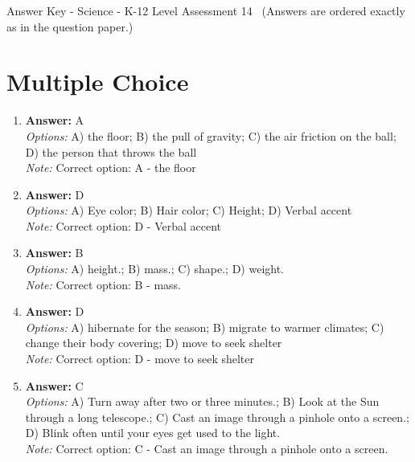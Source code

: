 \documentclass[12pt]{article}
\begin{document}
\begin{center}
Answer Key - Science - K-12 Level Assessment 14 \
\small (Answers are ordered exactly as in the question paper.)
\end{center}

\section*{Multiple Choice}
\begin{enumerate}[label=\arabic*.]
\item \textbf{Answer:} A
\\ \textit{Options:} A) the floor; B) the pull of gravity; C) the air friction on the ball; D) the person that throws the ball
\\ \textit{Note:} Correct option: A - the floor
\item \textbf{Answer:} D
\\ \textit{Options:} A) Eye color; B) Hair color; C) Height; D) Verbal accent
\\ \textit{Note:} Correct option: D - Verbal accent
\item \textbf{Answer:} B
\\ \textit{Options:} A) height.; B) mass.; C) shape.; D) weight.
\\ \textit{Note:} Correct option: B - mass.
\item \textbf{Answer:} D
\\ \textit{Options:} A) hibernate for the season; B) migrate to warmer climates; C) change their body covering; D) move to seek shelter
\\ \textit{Note:} Correct option: D - move to seek shelter
\item \textbf{Answer:} C
\\ \textit{Options:} A) Turn away after two or three minutes.; B) Look at the Sun through a long telescope.; C) Cast an image through a pinhole onto a screen.; D) Blink often until your eyes get used to the light.
\\ \textit{Note:} Correct option: C - Cast an image through a pinhole onto a screen.
\end{enumerate}
\end{document}
